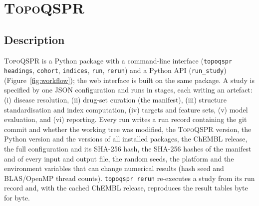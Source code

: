 \documentclass[preprint,12pt]{elsarticle}
\newcommand{\ml}{\textsc{TopoQSPR}}
\begin{document}
\begin{table}[t]
\centering\small
\caption{Disease-to-drug mapping in ChEMBL~37 \cite{embl2026chembl37} (\texttt{drug\_indication}, substring match on MeSH heading, queried 2026-10-02). ``Phase~4'' is the maximum phase reached \emph{for that indication}. Script: \texttt{audit\_chembl\_indications.py}.}
\label{tab:audit}
\end{table}

\section{\ml}\label{sec:tool}

\subsection{Description}
\ml{} is a Python package with a command-line interface (\texttt{topoqspr headings}, \texttt{cohort}, \texttt{indices}, \texttt{run}, \texttt{rerun}) and a Python API (\texttt{run\_study}) (Figure~\ref{fig:workflow}); the web interface is built on the same package. A study is specified by one JSON configuration and runs in stages, each writing an artefact: (i) disease resolution, (ii) drug-set curation (the manifest), (iii) structure standardisation and index computation, (iv) targets and feature sets, (v) model evaluation, and (vi) reporting. Every run writes a run record containing the git commit and whether the working tree was modified, the \ml{} version, the Python version and the versions of all installed packages, the ChEMBL release, the full configuration and its SHA-256 hash, the SHA-256 hashes of the manifest and of every input and output file, the random seeds, the platform and the environment variables that can change numerical results (hash seed and BLAS/OpenMP thread counts). \texttt{topoqspr rerun} re-executes a study from its run record and, with the cached ChEMBL release, reproduces the result tables byte for byte.
\end{document}
